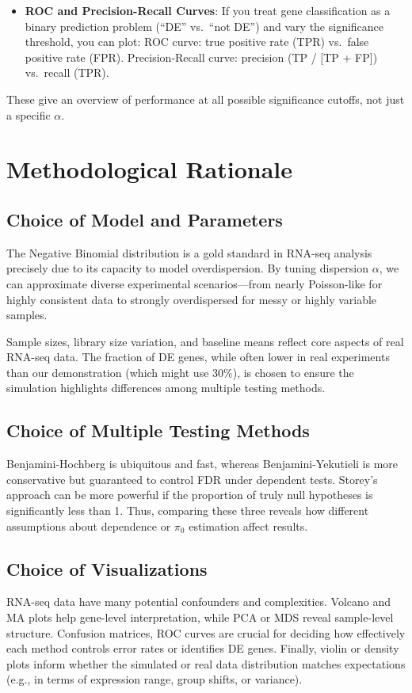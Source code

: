 \documentclass[12pt]{article}
\begin{document}
\begin{itemize}
\item \textbf{ROC and Precision-Recall Curves}: If you treat gene classification as a binary prediction problem (“DE” vs.\ “not DE”) and vary the significance threshold, you can plot:
    {ROC curve}: true positive rate (TPR) vs.\ false positive rate (FPR).  
    {Precision-Recall curve}: precision (TP / [TP + FP]) vs.\ recall (TPR). 
\end{itemize}
These give an overview of performance at all possible significance cutoffs, not just a specific $\alpha$.  

\section{Methodological Rationale}
\label{sec:methodrationale}

\subsection{Choice of Model and Parameters}
The Negative Binomial distribution is a gold standard in RNA-seq analysis precisely due to its capacity to model overdispersion. By tuning dispersion $\alpha$, we can approximate diverse experimental scenarios---from nearly Poisson-like for highly consistent data to strongly overdispersed for messy or highly variable samples.

Sample sizes, library size variation, and baseline means reflect core aspects of real RNA-seq data. The fraction of DE genes, while often lower in real experiments than our demonstration (which might use 30\%), is chosen to ensure the simulation highlights differences among multiple testing methods.

\subsection{Choice of Multiple Testing Methods}
Benjamini-Hochberg is ubiquitous and fast, whereas Benjamini-Yekutieli is more conservative but guaranteed to control FDR under dependent tests. Storey's approach can be more powerful if the proportion of truly null hypotheses is significantly less than 1. Thus, comparing these three reveals how different assumptions about dependence or $\pi_0$ estimation affect results.

\subsection{Choice of Visualizations}
RNA-seq data have many potential confounders and complexities. Volcano and MA plots help gene-level interpretation, while PCA or MDS reveal sample-level structure. Confusion matrices, ROC curves are crucial for deciding how effectively each method controls error rates or identifies DE genes. Finally, violin or density plots inform whether the simulated or real data distribution matches expectations (e.g., in terms of expression range, group shifts, or variance).
\end{document}
